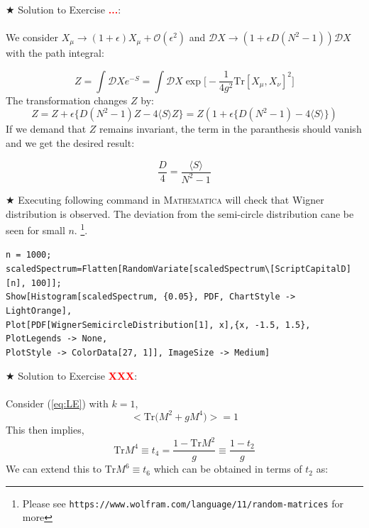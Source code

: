 \documentclass[11pt]{article}
\newcommand{\TODO}[1]{\textcolor{red}{{\bf #1}}}
\newcommand{\MA}{\textsc{Mathematica }}
\begin{document}
\noindent $\bigstar$ Solution to Exercise \TODO{...}: 
\\ \\ 
We consider $ X_{\mu} \to (1 + \epsilon) X_{\mu} + \mathcal{O}(\epsilon^2)$
and $\mathcal{D}X \to (1 + \epsilon D (N^2-1))\mathcal{D}X$ with the path integral:

\begin{equation}
Z = \int \mathcal{D}X e^{-S} = \int \mathcal{D}X \exp\Big[-\frac{1}{4g^2} \mbox{Tr} [X_\mu,X_\nu]^2\Big]
\end{equation}
The transformation changes $Z$ by:
\begin{equation}
	Z = Z + \epsilon \Big\{ D(N^2 -1)Z - 4\langle S \rangle Z  \Big\} = Z ( 1 + \epsilon \Big\{ D(N^2 -1) - 4\langle S \rangle   \Big\})
\end{equation}
If we demand that $Z$ remains invariant, the term in the paranthesis should vanish and we get the desired result:

\begin{equation}
	\frac{D}{4} = \frac{\langle S \rangle}{N^2 - 1 }
\end{equation}



\noindent $\bigstar$ Executing following command in \MA will check that Wigner distribution is observed. The deviation from the semi-circle distribution cane be seen for small $n$. \footnote{Please see \texttt{https://www.wolfram.com/language/11/random-matrices} for more}.  

\begin{mdframed}[backgroundcolor=magenta!2]
	\begin{footnotesize} 
		\verb"n = 1000;"\\ 
		\verb"scaledSpectrum=Flatten[RandomVariate[scaledSpectrum\[ScriptCapitalD][n], 100]];"\\
		\verb"Show[Histogram[scaledSpectrum, {0.05}, PDF, ChartStyle -> LightOrange], "  \\ 
		\verb"Plot[PDF[WignerSemicircleDistribution[1], x],{x, -1.5, 1.5}, PlotLegends -> None, " \\
		\verb"PlotStyle -> ColorData[27, 1]], ImageSize -> Medium]"
	\end{footnotesize} 
\end{mdframed}

\noindent $\bigstar$ Solution to Exercise \TODO{XXX}:
\\ \\ Consider (\ref{eq:LE}) with $k=1$, 
    \begin{equation}
    \Big< \mathrm{Tr}\Big(M^{2} + g M^{4}\Big) \Big> = 1 
    \end{equation}
    This then implies, 
     \begin{equation}
     \mathrm{Tr} M^{4} \equiv t_{4} = \frac{1 - \mathrm{Tr} M^{2}}{g} \equiv \frac{1 - t_2}{g} 
     \end{equation}
     We can extend this to $\mathrm{Tr} M^{6} \equiv t_{6}$ which can be obtained in terms of 
     $t_2$ as:  
     
\end{document}
